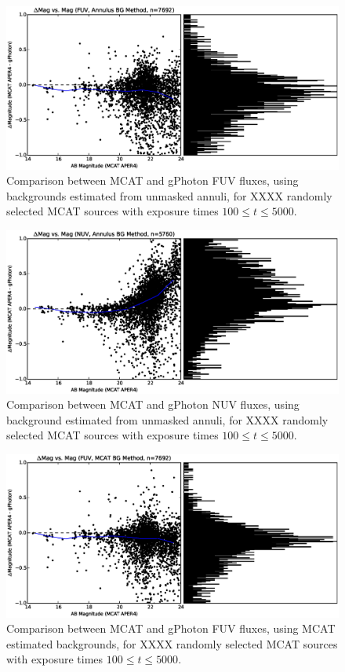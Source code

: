 \documentclass[5p]{elsarticle}
\begin{document}
\begin{figure}
\includegraphics[scale=0.32]{FigRelPhotFUV-annulus_bg.eps}
\caption{Comparison between MCAT and gPhoton FUV fluxes, using backgrounds estimated from unmasked annuli, for {\color{red}XXXX} randomly selected MCAT sources with exposure times $100 \leq t \leq 5000$. \label{fuvrelphot}}
\end{figure}

\begin{figure}
\includegraphics[scale=0.32]{FigRelPhotNUV-annulus_bg.eps}
\caption{Comparison between MCAT and gPhoton NUV fluxes, using background estimated from unmasked annuli, for {\color{red}XXXX} randomly selected MCAT sources with exposure times $100 \leq t \leq 5000$. \label{nuvrelphot}}
\end{figure}

\begin{figure}
\includegraphics[scale=0.32]{FigRelPhotFUV-mcat_bg.eps}
\caption{Comparison between MCAT and gPhoton FUV fluxes, using MCAT estimated backgrounds, for {\color{red}XXXX} randomly selected MCAT sources with exposure times $100 \leq t \leq 5000$. \label{fuvrelphot}}
\end{figure}
\end{document}

